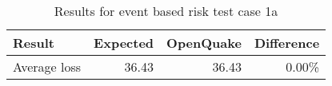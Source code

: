 \begin{table}[htbp]

\centering
\begin{tabular}{ l r r r }

\hline
\rowcolor{anti-flashwhite}
\bf{Result} & \bf{Expected} & \bf{OpenQuake} & \bf{Difference}\\
\hline
Average loss & 36.43 & 36.43 & 0.00\% \\
\hline
\end{tabular}

\caption{Results for event based risk test case 1a}
\label{tab:result-ebr-1a}
\end{table}
